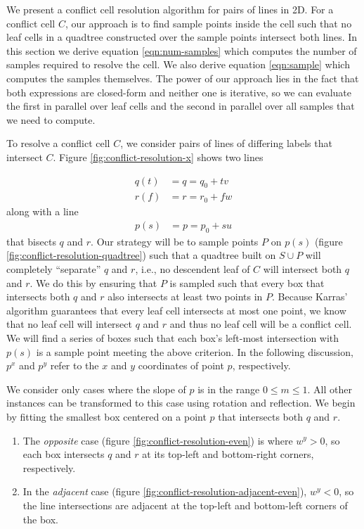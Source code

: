 \documentclass[final,3p,times,twocolumn]{elsarticle}
\begin{document}
We present a conflict cell resolution algorithm for pairs of lines in 2D. For a conflict cell $C$, our approach is to find sample points inside the cell such that no leaf cells in a quadtree constructed over the sample points intersect both lines. In this section we derive equation \eqref{eqn:num-samples} which computes the number of samples required to resolve the cell. We also derive equation \eqref{eqn:sample} which computes the samples themselves. The power of our approach lies in the fact that both expressions are closed-form and neither one is iterative, so we can evaluate the first in parallel over leaf cells and the second in parallel over all samples that we need to compute.

To resolve a conflict cell $C$, we consider pairs of lines of differing labels that intersect $C$. Figure \ref{fig:conflict-resolution-x} shows two lines

\begin{align}
q(t) &= q = q_0 + tv \label{eqn:q} \\
r(f) &= r = r_0 + fw \label{eqn:r}
\end{align}
along with a line
\begin{align}
p(s) &= p = p_0 + su \label{eqn:p}
\end{align}
that bisects $q$ and $r$. Our strategy will be to sample points $P$ on $p(s)$ (figure \ref{fig:conflict-resolution-quadtree}) such that a quadtree built on $S \cup P$ will completely ``separate'' $q$ and $r$, i.e., no descendent leaf of $C$ will intersect both $q$ and $r$. We do this by ensuring that $P$ is sampled such that every box that intersects both $q$ and $r$ also intersects at least two points in $P$. Because Karras' algorithm guarantees that every leaf cell intersects at most one point, we know that no leaf cell will intersect $q$ and $r$ and thus no leaf cell will be a conflict cell. We will find a series of boxes such that each box's left-most intersection with $p(s)$ is a sample point meeting the above criterion. In the following discussion, $p^x$ and $p^y$ refer to the $x$ and $y$ coordinates of point $p$, respectively.

We consider only cases where the slope of $p$ is in the range $0 \le m \le 1$. All other instances can be transformed to this case using rotation and reflection. We begin by fitting the smallest box centered on a point $p$ that intersects both $q$ and $r$. 
\begin{enumerate}
 \item The \textit{opposite} case (figure \ref{fig:conflict-resolution-even}) is where $w^y > 0$, so each box intersects $q$ and $r$ at its top-left and bottom-right corners, respectively.
 \item In the \textit{adjacent} case (figure \ref{fig:conflict-resolution-adjacent-even}), $w^y < 0$, so the line intersections are adjacent at the top-left and bottom-left corners of the box.
\end{enumerate}
\end{document}
